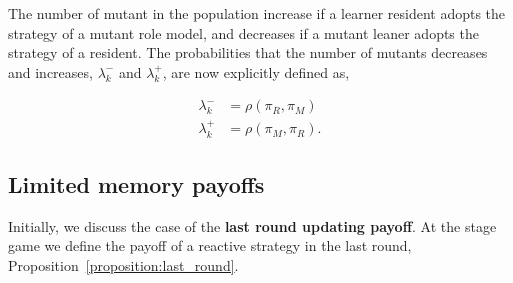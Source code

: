 \documentclass[11pt]{article}
\theoremstyle{plainCl1}
\theoremstyle{plainCl2}
\begin{document}
The number of mutant in the population increase if a learner resident adopts the
strategy of a mutant role model, and decreases if a mutant leaner adopts the
strategy of a resident. The probabilities that the number of mutants decreases
and increases, \(\lambda^-_k\) and \(\lambda^+_k\), are now explicitly defined
as,

\begin{align*} 
  \lambda^-_k &\!=\!\rho(\pi_R, \pi_M) \\
  \lambda^+_k &\!=\!\rho(\pi_M, \pi_R).
\end{align*}

\subsection*{Limited memory payoffs}

Initially, we discuss the case of the \textbf{last round updating payoff}. At
the stage game we define the payoff of a reactive strategy in the last round,
Proposition~\ref{proposition:last_round}.
\end{document}
